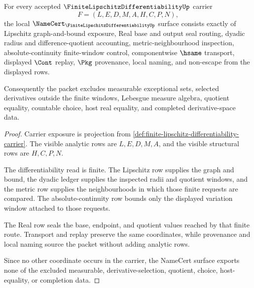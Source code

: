 \begin{theorem}
\label{thm:finite-lipschitz-differentiability-namecert-obligations}
For every accepted $\FiniteLipschitzDifferentiabilityUp$ carrier
$$
F=(L,E,D,M,A,H,C,P,N),
$$
the local $\NameCert_{\FiniteLipschitzDifferentiabilityUp}$ surface consists exactly of Lipschitz graph-and-bound exposure, Real base and output seal routing, dyadic radius and difference-quotient accounting, metric-neighbourhood inspection, absolute-continuity finite-window control, componentwise $\hsame$ transport, displayed $\Cont$ replay, $\Pkg$ provenance, local naming, and non-escape from the displayed rows.

Consequently the packet excludes measurable exceptional sets, selected derivatives outside the finite windows, Lebesgue measure algebra, quotient equality, countable choice, host real equality, and completed derivative-space data.
\end{theorem}
\begin{proof}
Carrier exposure is projection from \autoref{def:finite-lipschitz-differentiability-carrier}. The visible analytic rows are $L,E,D,M,A$, and the visible structural rows are $H,C,P,N$.

The differentiability read is finite. The Lipschitz row supplies the graph and bound, the dyadic ledger supplies the inspected radii and quotient windows, and the metric row supplies the neighbourhoods in which those finite requests are compared. The absolute-continuity row bounds only the displayed variation window attached to those requests.

The Real row seals the base, endpoint, and quotient values reached by that finite route. Transport and replay preserve the same coordinates, while provenance and local naming source the packet without adding analytic rows.

Since no other coordinate occurs in the carrier, the NameCert surface exports none of the excluded measurable, derivative-selection, quotient, choice, host-equality, or completion data.
\end{proof}


